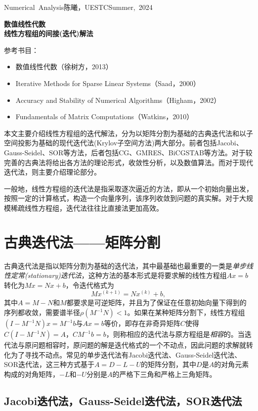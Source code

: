 \documentclass[a4paper,10pt]{ctexart}
\begin{document}
\hfill\vbox{\hbox{Numerical Analysis}\hbox{陈曦，UESTC}\hbox{Summer, 2024}}

\begin{center}\Large
    \textbf{数值线性代数}\\{\normalsize\bf {线性方程组的间接(迭代)解法}}
\end{center}
\vskip 30pt
\small {参考书目：
\begin{itemize}
    \item 数值线性代数（徐树方，2013）
    \item Iterative Methods for Sparse Linear Systems（Saad，2000）
    \item Accuracy and Stability of Numerical Algorithms（Higham，2002）
    \item Fundamentals of Matrix Computations（Watkins，2010）
\end{itemize}}

本文主要介绍线性方程组的迭代解法，分为以矩阵分割为基础的古典迭代法和以子空间投影为基础的现代迭代法(Krylov子空间方法)两大部分。前者包括Jacobi、Gauss-Seidel、SOR等方法，后者包括CG、GMRES、BiCGSTAB等方法。对于较完善的古典法将给出各方法的理论形式，收敛性分析，以及数值算法。而对于现代迭代法，则主要介绍理论部分。

一般地，线性方程组的迭代法是指采取逐次逼近的方法，即从一个初始向量出发，按照一定的计算格式，构造一个向量序列，该序列收敛到问题的真实解。对于大规模稀疏线性方程组，迭代法往往比直接法更加高效。

\section{古典迭代法——矩阵分割}
古典迭代法是指以矩阵分割为基础的迭代法，其中最基础也最重要的一类是\emph{单步线性定常(stationary)迭代法}，这种方法的基本形式是将要求解的线性方程组$Ax=b$转化为$ Mx=Nx+b $，令迭代格式为
\[
    Mx^{(k+1)} = Nx^{(k)} + b,
\]
其中$ A=M-N $和$ M $都要求是可逆矩阵，并且为了保证在任意初始向量下得到的序列都收敛，需要谱半径$ \rho(M^{-1}N)<1 $。如果在某种矩阵分割下，线性方程组$ (I-M^{-1}N)x=M^{-1}b $与$ Ax=b $等价，即存在非奇异矩阵$ C $使得$ C(I-M^{-1}N)=A $，$ CM^{-1}b = b $，则称相应的迭代法与原方程组是\emph{相容}的。当迭代法与原问题相容时，原问题的解是迭代格式的一个不动点，因此问题的求解就转化为了寻找不动点。常见的单步迭代法有Jacobi迭代法、Gauss-Seidel迭代法、SOR迭代法，这三种方式基于$ A=D-L-U $的矩阵分割，其中$ D $是$ A $的对角元素构成的对角矩阵，$ -L $和$ -U $分别是$ A $的严格下三角和严格上三角矩阵。
\subsection{Jacobi迭代法，Gauss-Seidel迭代法，SOR迭代法}   
\end{document}
